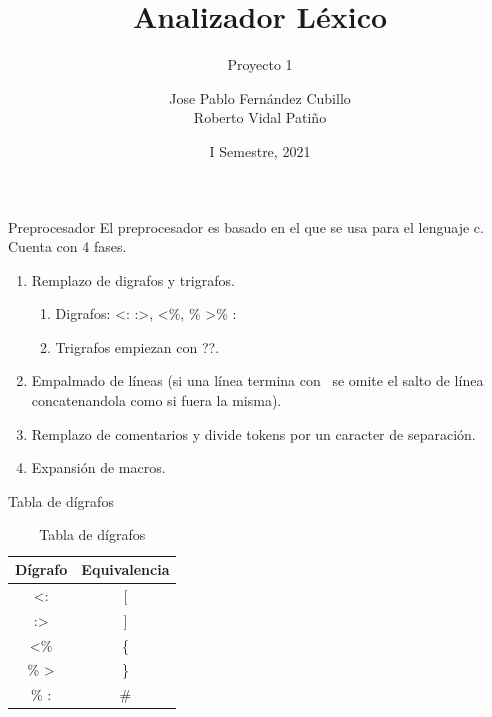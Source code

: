 \documentclass[aspectratio=43]{beamer}
\title{Analizador Léxico}
\subtitle{Proyecto 1}
\author[Jose P. Fernández, Roberto Vidal]{
    Jose Pablo Fernández Cubillo%
    \\%
    Roberto Vidal Patiño%
}
\institute[Tecnológico de Costa Rica]{
    Tecnológico de Costa Rica%
    \\%
    Compiladores e Intérpretes%
}
\date{I Semestre, 2021}
\begin{document}
    
    \frame{\titlepage}

    \begin{frame}{Preprocesador}
            El preprocesador es basado en el que se usa para el lenguaje c. Cuenta con 4 fases. \\
            \begin{enumerate}
                \item Remplazo de digrafos y trigrafos.
                \begin{enumerate}
                    \item Digrafos: \textless : :\textgreater, \textless \%, \% \textgreater \% :
                    \item Trigrafos empiezan con ??.
                \end{enumerate}
                \item Empalmado de líneas (si una línea termina con \ se omite el salto de línea concatenandola como si fuera la misma).
                \item Remplazo de comentarios y divide tokens por un caracter de separación.
                \item Expansión de macros.
            \end{enumerate}
    \end{frame}

    \begin{frame}{Tabla de dígrafos}
        \begin{table}
            \begin{tabular}{c | c}
            Dígrafo & Equivalencia \\
            \hline \hline
                \textless : & [ \\
                :\textgreater & ] \\
                \textless \% & \{ \\
                \% \textgreater & \} \\
                \% : & \# 
            \end{tabular}
            \caption{Tabla de dígrafos}
        \end{table}

    \end{frame}
\end{document}
